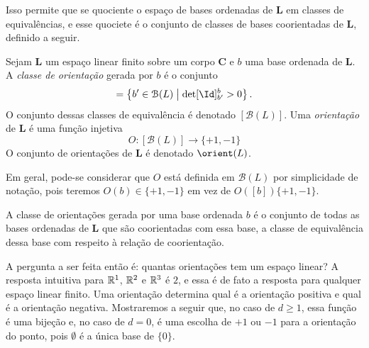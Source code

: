 Isso permite que se quociente o espaço de bases ordenadas de $\bm L$ em classes de equivalências, e esse quociete é o conjunto de classes de bases coorientadas de $\bm L$, definido a seguir.

\begin{defi}
Sejam $\bm L$ um espaço linear finito sobre um corpo $\bm C$ e $b$ uma base ordenada de $\bm L$. A \emph{classe de orientação} gerada por $b$ é o conjunto
	\begin{equation*}
	[b] = \set{b' \in \mathcal{B}(L)}{\det [\Id]^b_{b'} > 0}.
	\end{equation*}
O conjunto dessas classes de equivalência é denotado $[\mathcal{B}(L)]$. Uma \emph{orientação} de $\bm L$ é uma função injetiva
	\begin{equation*}
	O\colon [\mathcal{B}(L)] \to \{+1,-1\}
	\end{equation*}
O conjunto de orientações de $\bm L$ é denotado $\orient(L)$.
\end{defi}

Em geral, pode-se considerar que $O$ está definida em $\mathcal{B}(L)$ por simplicidade de notação, pois teremos $O(b) \in \{+1,-1\}$ em vez de $O([b])\{+1,-1\}$.

A classe de orientações gerada por uma base ordenada $b$ é o conjunto de todas as bases ordenadas de $\bm L$ que são coorientadas com essa base, a classe de equivalência dessa base com respeito à relação de coorientação. 

A pergunta a ser feita então é: quantas orientações tem um espaço linear? A resposta intuitiva para $\mathbb{R}^1$, $\mathbb{R}^2$ e $\mathbb{R}^3$ é $2$, e essa é de fato a resposta para qualquer espaço linear finito. Uma orientação determina qual é a orientação positiva e qual é a orientação negativa. Mostraremos a seguir que, no caso de $d \geq 1$, essa função é uma bijeção e, no caso de $d=0$, é uma escolha de $+1$ ou $-1$ para a orientação do ponto, pois $\emptyset$ é a única base de $\{0\}$.

